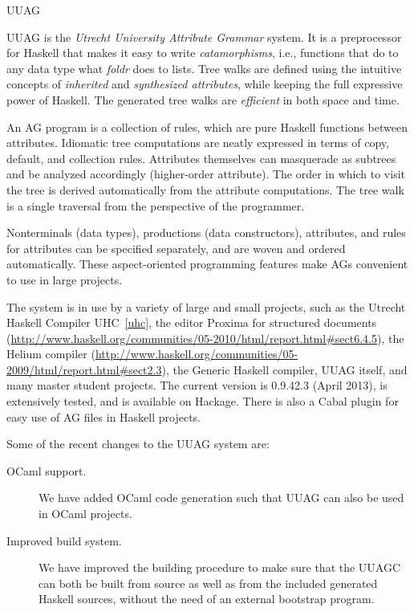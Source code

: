 \begin{hcarentry}[updated]{UUAG}
\label{uuag}
\makeheader

UUAG is the \emph{Utrecht University Attribute Grammar} system. It is a preprocessor for Haskell
that makes it easy to write \emph{catamorphisms}, i.e., functions that do to any data type what
\emph{foldr} does to lists. Tree walks are defined using the intuitive concepts of
\emph{inherited} and \emph{synthesized attributes}, while keeping the full expressive power
of Haskell. The generated tree walks are \emph{efficient} in both space and time.

An AG program is a collection of rules, which are pure Haskell functions between attributes.
Idiomatic tree computations are neatly expressed in terms of copy, default, and collection rules.
Attributes themselves can masquerade as subtrees and be analyzed accordingly (higher-order attribute). The order in which to visit the tree is derived automatically from the attribute computations. The tree walk is a single traversal from the perspective of the programmer.

Nonterminals (data types), productions (data constructors), attributes, and rules for attributes can be specified separately, and are woven and ordered automatically. These aspect-oriented programming features make AGs convenient to use in large projects.

The system is in use by a variety of large and small projects, such as the Utrecht Haskell Compiler UHC~\cref{uhc}, the editor Proxima for structured documents (\url{http://www.haskell.org/communities/05-2010/html/report.html#sect6.4.5}), the Helium compiler (\url{http://www.haskell.org/communities/05-2009/html/report.html#sect2.3}), the Generic Haskell compiler, UUAG itself, and many master student projects.
The current version is 0.9.42.3 (April 2013), is extensively tested, and is available on Hackage. There is also a Cabal plugin for easy use of AG files in Haskell projects.

Some of the recent changes to the UUAG system are:
\begin{description}
\item[OCaml support.]
  We have added OCaml code generation such that UUAG can also be used in OCaml projects.

\item[Improved build system.]
  We have improved the building procedure to make sure that the UUAGC can both be built from source as well as from the included generated Haskell sources, without the need of an external bootstrap program. 


\end{description}
\end{hcarentry}
